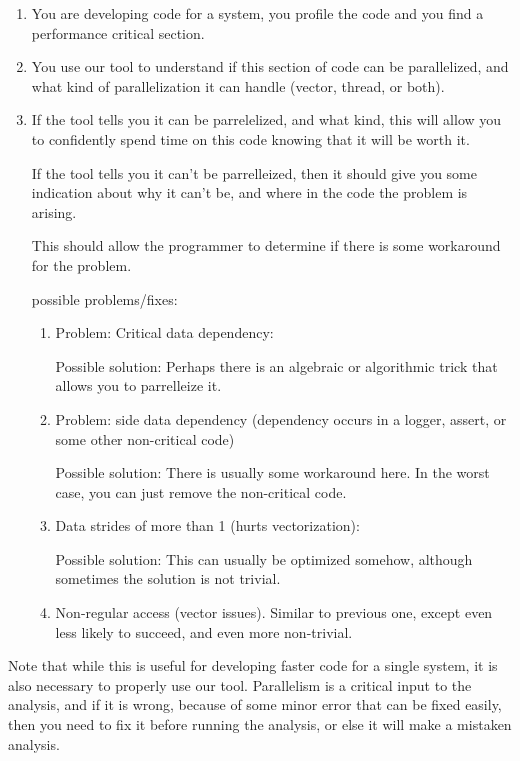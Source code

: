 \documentclass[12pt,twoside]{reedthesis}
\begin{document}
		\begin{enumerate}
			\item 
			You are developing code for a system, you profile the code and you find a performance critical section.
			\item You use our tool to understand if this section of code can be parallelized, and what kind of parallelization it can handle (vector, thread, or both). 
			
			\item If the tool tells you it can be parrelelized, and what kind, this will allow you to confidently spend time on this code knowing that it will be worth it. 
			
			If the tool tells you it can't be parrelleized, then it should give you some indication about why it can't be, and where in the code the problem is arising. 
			
			This should allow the programmer to determine if there is some workaround for the problem.
			
			possible problems/fixes:
			
			\begin{enumerate}
				\item Problem: Critical data dependency:
				
				Possible solution: Perhaps there is an algebraic or algorithmic trick that allows you to parrelleize it.
				
				\item Problem: side data dependency (dependency occurs in a logger, assert, or some other non-critical code)
				
				Possible solution: There is usually some workaround here. In the worst case, you can just remove the non-critical code. 
				
				\item Data strides of more than 1 (hurts vectorization):
				
				Possible solution: This can usually be optimized somehow, although sometimes the solution is not trivial. 
				
				\item Non-regular access (vector issues). Similar to previous one, except even less likely to succeed, and even more non-trivial. 
			\end{enumerate}
			
		\end{enumerate} 
		
		Note that while this is useful for developing faster code for a single system, it is also necessary to properly use our tool. Parallelism is a critical input to the analysis, and if it is wrong, because of some minor error that can be fixed easily, then you need to fix it before running the analysis, or else it will make a mistaken analysis. 
		
\end{document}
